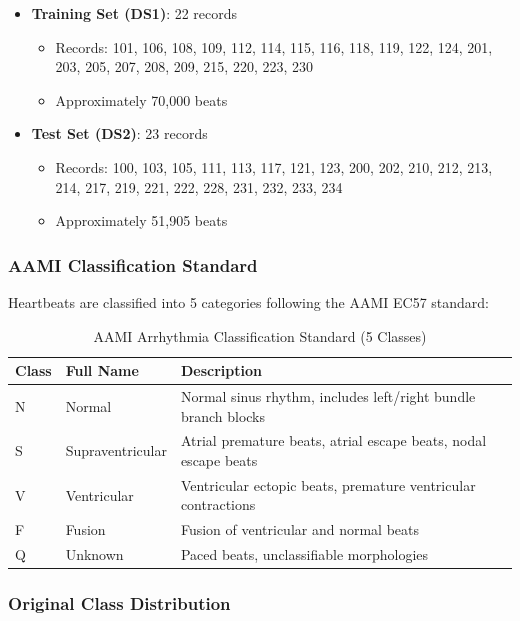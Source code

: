 \documentclass[12pt,a4paper]{article}
\begin{document}
\begin{itemize}
    \item \textbf{Training Set (DS1)}: 22 records
    \begin{itemize}
        \item Records: 101, 106, 108, 109, 112, 114, 115, 116, 118, 119, 122, 124, 201, 203, 205, 207, 208, 209, 215, 220, 223, 230
        \item Approximately 70,000 beats
    \end{itemize}
    \item \textbf{Test Set (DS2)}: 23 records
    \begin{itemize}
        \item Records: 100, 103, 105, 111, 113, 117, 121, 123, 200, 202, 210, 212, 213, 214, 217, 219, 221, 222, 228, 231, 232, 233, 234
        \item Approximately 51,905 beats
    \end{itemize}
\end{itemize}

\subsubsection{AAMI Classification Standard}

Heartbeats are classified into 5 categories following the AAMI EC57 standard:

\begin{table}[H]
\centering
\begin{tabular}{@{}llp{7cm}@{}}
\toprule
\textbf{Class} & \textbf{Full Name} & \textbf{Description} \\ 
\midrule
N & Normal & Normal sinus rhythm, includes left/right bundle branch blocks \\
S & Supraventricular & Atrial premature beats, atrial escape beats, nodal escape beats \\
V & Ventricular & Ventricular ectopic beats, premature ventricular contractions \\
F & Fusion & Fusion of ventricular and normal beats \\
Q & Unknown & Paced beats, unclassifiable morphologies \\ 
\bottomrule
\end{tabular}
\caption{AAMI Arrhythmia Classification Standard (5 Classes)}
\label{tab:aami_classes}
\end{table}

\subsubsection{Original Class Distribution}
\end{document}
